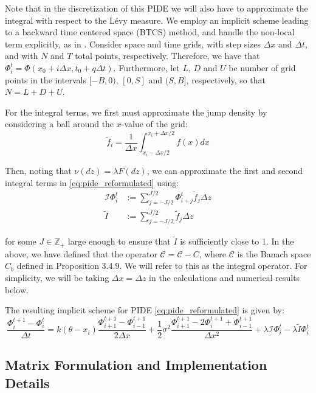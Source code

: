 \documentclass[11pt,twoside,openright]{report}
\begin{document}
Note that in the discretization of this PIDE we will also have to approximate the integral with respect to the Lévy measure. We employ an implicit scheme leading to a backward time centered space (BTCS) method, and handle the non-local term explicitly, as in \cite{cont2005finite}. Consider space and time grids, with step sizes $\Delta x$ and $\Delta t$, and with $N$ and $T$ total points, respectively. Therefore, we have that $\Phi^t_i = \Phi(x_0 + i\Delta x, t_0 + q\Delta t)$. Furthermore, let $L$, $D$ and $U$ be number of grid points in the intervals $[-B, 0)$, $[0, S]$ and $(S, B]$, respectively, so that $N = L + D + U$.

For the integral terms, we first must approximate the jump density by considering a ball around the $x$-value of the grid:
\begin{equation}
\tilde{f}_i = \frac{1}{\Delta x} \int_{x_i - \Delta x/2}^{x_i + \Delta x/2} f(x) dx
\label{eq:jump_density_approximation}
\end{equation}

Then, noting that $\nu(dz) = \lambda F(dz)$, we can approximate the first and second integral terms in \eqref{eq:pide_reformulated} using:
\begin{align}
\mathcal{I}\Phi^t_i &:= \sum_{j=-J/2}^{J/2} \Phi^t_{i+j} \tilde{f}_j \Delta z \label{eq:integral_approximation_1} \\
\tilde{I} &:= \sum_{j=-J/2}^{J/2} \tilde{f}_j \Delta z \label{eq:integral_approximation_2}
\end{align}

for some $J \in \mathbb{Z}_+$ large enough to ensure that $\tilde{I}$ is sufficiently close to 1. In the above, we have defined that the operator $\mathcal{C} = \mathcal{C} - C$, where $\mathcal{C}$ is the Banach space $C_b$ defined in Proposition 3.4.9. We will refer to this as the integral operator. For simplicity, we will be taking $\Delta x = \Delta z$ in the calculations and numerical results below.

The resulting implicit scheme for PIDE \eqref{eq:pide_reformulated} is given by:
\begin{equation}
\frac{\Phi^{t+1}_i - \Phi^t_i}{\Delta t} = k(\theta - x_i)\frac{\Phi^{t+1}_{i+1} - \Phi^{t+1}_{i-1}}{2\Delta x} + \frac{1}{2}\sigma^2 \frac{\Phi^{t+1}_{i+1} - 2\Phi^{t+1}_i + \Phi^{t+1}_{i-1}}{\Delta x^2} + \lambda\mathcal{I}\Phi^t_i - \lambda\tilde{I}\Phi^t_i
\label{eq:implicit_scheme}
\end{equation}

\subsection{Matrix Formulation and Implementation Details}
\end{document}
